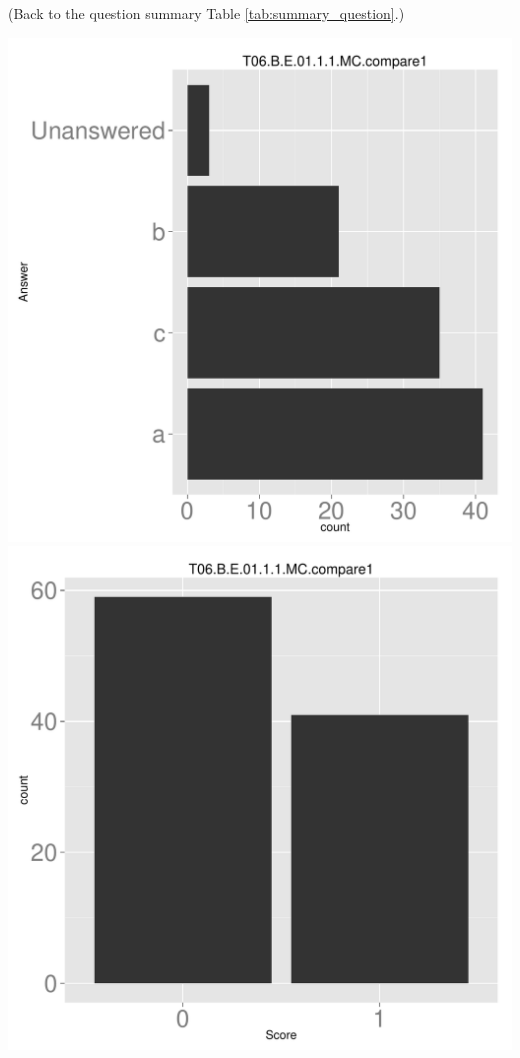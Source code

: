 \documentclass[12pt,nohyper]{tufte-handout}\usepackage[]{graphicx}\usepackage[]{color}
\begin{document}
 (Back to the question summary Table \ref{tab:summary_question}.)

\begin{center} \includegraphics[width=.45\linewidth]{Topic06_17_answer} \includegraphics[width=.45\linewidth]{Topic06_17_score} \end{center} 
\end{document}
